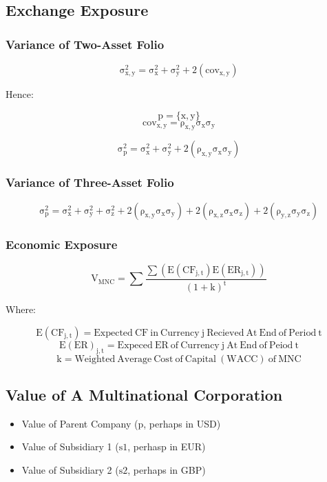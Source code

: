 \documentclass[11pt, english]{article}
\begin{document}
\newpage

	\subsection{Exchange Exposure}

		\subsubsection{Variance of Two-Asset Folio}

	$$\mathrm{\sigma_{x,y}^2=\sigma_x^2+\sigma_y^2+2(cov_{x,y})}$$

	\begin{center}Hence:\end{center}
	$$\mathrm{p=\{x,y\}}$$
	$$\mathrm{cov_{x,y}=\rho_{x,y}\sigma_x\sigma_y}$$

	$$\mathrm{\sigma_p^2=\sigma_x^2+\sigma_y^2+2(\rho_{x,y}\sigma_x\sigma_y)}$$

		\subsubsection{Variance of Three-Asset Folio}

	$$\mathrm{\sigma_p^2=\sigma_x^2+\sigma_y^2+\sigma_z^2+2(\rho_{x,y}\sigma_x\sigma_y)+2(\rho_{x,z}\sigma_x\sigma_z)+2(\rho_{y,z}\sigma_y\sigma_z)}$$

		\subsubsection{Economic Exposure}

	$$\mathrm{V_{MNC}=\sum\frac{\sum(E(CF_{j,t})E(ER_{j,t}))}{(1+k)^t}}$$

	\begin{center}Where:\end{center}
	$$\mathrm{E(CF_{j,t})=Expected\ CF\ in\ Currency\ j\ Recieved\ At\ End\ of\ Period\ t}$$
	$$\mathrm{E(ER)_{j,t}=Expeced\ ER\ of\ Currency\ j\ At\ End\ of\ Peiod\ t}$$
	$$\mathrm{k=Weighted\ Average\ Cost\ of\ Capital\ (WACC)\ of\ MNC}$$

\newpage

	\subsection{Value of A Multinational Corporation}

	\begin{itemize}
	\setlength\itemsep{0cm}
		\item Value of Parent Company ($\mathrm{p}$, perhaps in USD)
		\item Value of Subsidiary 1 ($\mathrm{s1}$, perhasp in EUR)
		\item Value of Subsidiary 2 ($\mathrm{s2}$, perhaps in GBP)
	\end{itemize}
\end{document}
